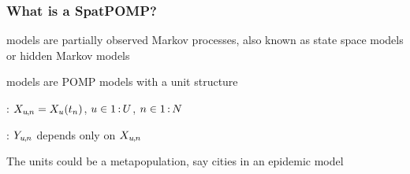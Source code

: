 \documentclass{beamer}
\begin{document}
\begin{frame}

  \frametitle{What is a SpatPOMP?}

   models are partially observed Markov processes, also known as state space models or hidden Markov models

  \vspace{6mm}
  
   models are POMP models with a unit structure

    \vspace{6mm}
 
  : $X_{u{\hspace{-0.25mm},\hspace{-0.2mm}}n}=X_{u}(t_n)$, \hspace{1mm} $u\in 1{{\hspace{0.6mm}:\hspace{0.6mm}}}U$, \hspace{1mm} $n\in 1{{\hspace{0.6mm}:\hspace{0.6mm}}}N$

    \vspace{6mm}
 
  : $Y_{u{\hspace{-0.25mm},\hspace{-0.2mm}}n}$ depends only on $X_{u{\hspace{-0.25mm},\hspace{-0.2mm}}n}$

    \vspace{6mm}
 
The units could be a metapopulation, say cities in an epidemic model

\end{frame}
\end{document}
